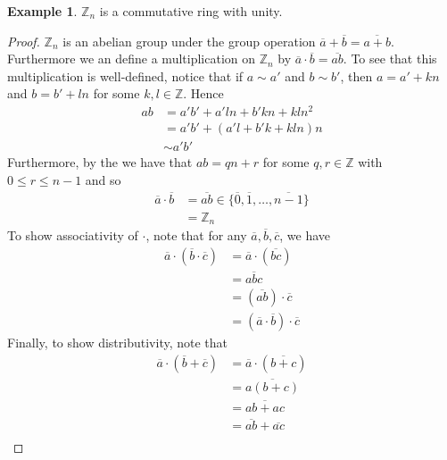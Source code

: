 \documentclass[12pt,letterpaper,DIV=11,final]{scrartcl}
\theoremstyle{plain}
\theoremstyle{definition}
\newtheorem{example}{Example}[section]
\theoremstyle{remark}
\begin{document}
\begin{example}
  $\mathbb{Z}_n$ is a commutative ring with unity.
  \begin{proof}
    $\mathbb{Z}_n$ is an abelian group under the group operation $\overline{a} + \overline{b} = \overline{a + b}$.
    Furthermore we an define a multiplication on $\mathbb{Z}_n$ by $\overline{a} \cdot \overline{b} = \overline{ab}$.
    To see that this multiplication is well-defined, notice that if $a \sim a'$ and $b \sim b'$, then $a = a' + kn$ and $b = b' + l n$ for some $k, l \in \mathbb{Z}$. Hence
    \begin{align*}
      ab &= a'b' + a' l n + b' kn + kln^2 \\
         &= a'b' + (a'l + b'k + kln) n \\
         &\sim a' b'
    \end{align*}
    Furthermore, by the  we have that $ab = qn + r$ for some $q, r \in \mathbb{Z}$ with $0 \leq r \leq n - 1$ and so
    \begin{align*}
      \overline{a} \cdot \overline{b} &= \overline{ab} \in \{ \overline{0}, \overline{1}, \dots, \overline{n - 1} \} \\
                                      &= \mathbb{Z}_n
    \end{align*}
    To show associativity of $\cdot$, note that for any $\overline{a}, \overline{b}, \overline{c}$, we have
    \begin{align*}
      \overline{a} \cdot (\overline{b} \cdot \overline{c}) &= \overline{a} \cdot (\overline{b c}) \\
                                                           &= \overline{a b c} \\
                                                           &= ( \overline{ab} ) \cdot \overline{c} \\
                                                           &= (\overline{a} \cdot \overline{b}) \cdot \overline{c}
    \end{align*}
    Finally, to show distributivity, note that
    \begin{align*}
      \overline{a} \cdot (\overline{b} + \overline{c}) &= \overline{a} \cdot (\overline{b + c}) \\
                                                       &= \overline{a (b + c)} \\
                                                       &= \overline{ab + ac} \\
                                                       &= \overline{ab} + \overline{ac} \\

\end{align*}
\end{proof}
\end{example}
\end{document}
